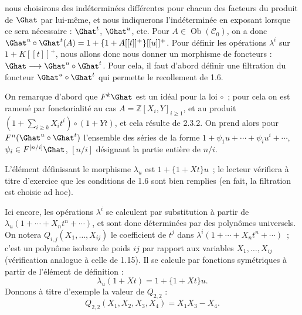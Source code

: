 nous choisirons des indéterminées différentes pour chacun des facteurs du produit de \(\Ghat\) par lui-même, et nous indiquerons l'indéterminée en exposant lorsque ce sera nécessaire : \(\Ghat^t\), \(\Ghat^u\), etc. Pour \(A\in\operatorname{Ob}(\mathcal C_0)\), on a donc \(\Ghat^u\circ\Ghat^t(A)=1+\{1+A[[t]]^+\}[[u]]^+\). Pour définir les opérations \(\lambda^i\) sur \(1+K[[t]]^+\), nous allons donc nous donner un morphisme de foncteurs : \(\Ghat\longrightarrow\Ghat^u\circ\Ghat^t\).
Pour cela, il faut d'abord définir une filtration du foncteur \(\Ghat^u\circ\Ghat^t\) qui permette le recollement de 1.6.

On remarque d'abord que \(F^k\Ghat\) est un idéal pour la loi \(\circ\)~; pour cela on est ramené par fonctorialité au cas \(A=\mathbb Z[X_i,Y]_{i\geq1}\), et au produit \(\left(1+\sum_{i\geq k}X_i t^i\right)\circ(1+Yt)\), et cela résulte de 2.3.2. On prend alors pour \(F^n(\Ghat^u\circ\Ghat^t)\) l'ensemble des séries de la forme \(1+\psi_1u+\cdots+\psi_i u^i+\cdots\), \(\psi_i\in F^{[n/i]}\Ghat\), \([n/i]\) désignant la partie entière de \(n/i\).

L'élément définissant le morphisme \(\lambda_u\) est \(1+\{1+Xt\}u\)~; le lecteur vérifiera à titre d'exercice que les conditions de 1.6 sont bien remplies (en fait, la filtration est choisie ad hoc).

Ici encore, les opérations \(\lambda^i\) se calculent par substitution à partir de \(\lambda_u(1+\cdots+X_nt^n+\cdots)\), et sont donc déterminées par des polynômes universels. On notera \(Q_{i,j}(X_1,\ldots,X_{ij})\) le coefficient de \(t^j\) dans \(\lambda^i(1+\cdots+X_nt^n+\cdots)\)~; c'est un polynôme isobare de poids \(ij\) par rapport aux variables \(X_1,\ldots,X_{ij}\) (vérification analogue à celle de 1.15). Il se calcule par fonctions symétriques à partir de l'élément de définition :
\begin{equation}\tag{2.3.3}
  \lambda_u(1+Xt)=1+\{1+Xt\}u.
\end{equation}
Donnons à titre d'exemple la valeur de \(Q_{2,2}\) :
\[
  Q_{2,2}(X_1,X_2,X_3,X_4)=X_1X_3-X_4.
\]

